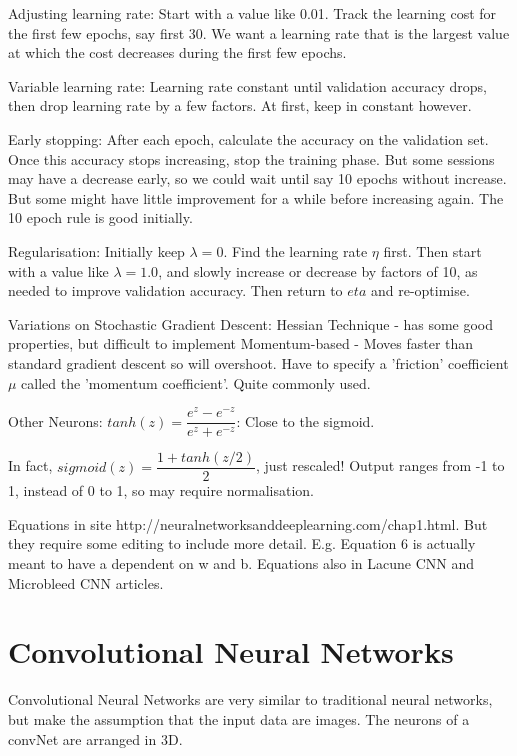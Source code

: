 \documentclass[honours,12pt]{unswthesis}
\numberwithin{equation}{section}
\begin{document}
Adjusting learning rate:
Start with a value like 0.01. Track the learning cost for the first few epochs, say first 30. We want a learning rate that is the largest value at which the cost decreases during the first few epochs.

Variable learning rate:
Learning rate constant until validation accuracy drops, then drop learning rate by a few factors. At first, keep in constant however.

Early stopping:
After each epoch, calculate the accuracy on the validation set. Once this accuracy stops increasing, stop the training phase. But some sessions may have a decrease early, so we could wait until say 10 epochs without increase. But some might have little improvement for a while before increasing again. The 10 epoch rule is good initially.

Regularisation:
Initially keep $\lambda = 0$. Find the learning rate $\eta$ first. Then start with a value like $\lambda = 1.0$, and slowly increase or decrease by factors of 10, as needed to improve validation accuracy. Then return to $eta$ and re-optimise.

Variations on Stochastic Gradient Descent:
Hessian Technique - has some good properties, but difficult to implement
Momentum-based - Moves faster than standard gradient descent so will overshoot. Have to specify a 'friction' coefficient $\mu$ called the 'momentum coefficient'. Quite commonly used.

Other Neurons:
$tanh(z) = \dfrac{e^z - e^{-z}}{e^z + e^{-z}}$: Close to the sigmoid.

In fact, $sigmoid(z) = \dfrac{1 + tanh(z/2)}{2}$, just rescaled! Output ranges from -1 to 1, instead of 0 to 1, so may require normalisation.

Equations in site http://neuralnetworksanddeeplearning.com/chap1.html. But they require some editing to include more detail. E.g. Equation 6 is actually meant to have a dependent on w and b.
Equations also in Lacune CNN and Microbleed CNN articles.

\section{Convolutional Neural Networks}\label{convNeuralNets}

Convolutional Neural Networks are very similar to traditional neural networks, but make the assumption that the input data are images.
The neurons of a convNet are arranged in 3D. 
\end{document}

